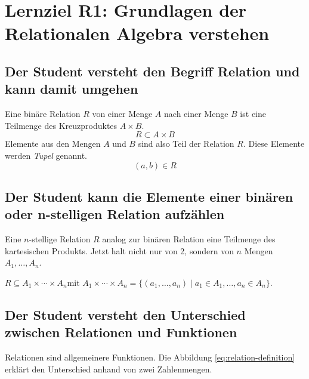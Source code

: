 \section{Lernziel R1: Grundlagen der Relationalen Algebra verstehen}

\subsection{Der Student versteht den Begriff Relation und kann damit umgehen}
Eine binäre Relation \(R\) von einer Menge \(A\) nach einer Menge \(B\) ist eine Teilmenge des Kreuzproduktes \(A \times B\).
\begin{equation*}
    R \subset A \times B
\end{equation*}
Elemente aus den Mengen \(A\) und \(B\) sind also Teil der Relation \(R\). Diese Elemente werden \emph{Tupel} genannt.
\begin{equation*}
  (a,b)\in R
\end{equation*}

\subsection{Der Student kann die Elemente einer binären oder n-stelligen Relation aufzählen}
Eine \(n\)-stellige Relation \(R\) analog zur binären Relation eine Teilmenge des kartesischen Produkts. Jetzt halt nicht nur von 2, sondern von \(n\) Mengen \(A_{1}, \dotsc, A_{n}\).


\( R \subseteq A_{1} \times \dotsb \times A_{n}\)mit \(A_1 \times \dotsb \times A_n = \{(a_1, \dotsc, a_n) \mid a_1 \in A_1, \dotsc, a_n \in A_n\}\).

\subsection{Der Student versteht den Unterschied zwischen Relationen und Funktionen}
Relationen sind allgemeinere Funktionen. Die Abbildung \ref{eq:relation-definition} erklärt den Unterschied anhand von zwei Zahlenmengen.

